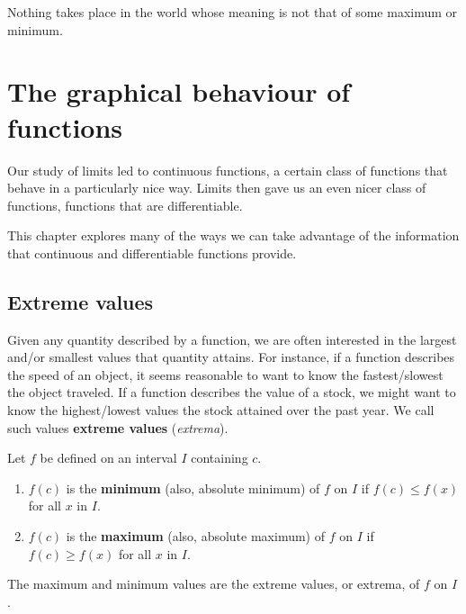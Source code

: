 \begin{savequote}[75mm]
Nothing takes place in the world whose meaning is not that of some maximum or minimum.
\end{savequote}

\chapter{The graphical behaviour of functions}
\label{chap_behaviour}
\graphicspath{{figures/Behaviour/}}



Our study of limits led to continuous functions,  a certain class of functions that behave in a particularly nice way. Limits then gave us an even nicer class of functions, functions that are differentiable.

This chapter explores many of the ways we can take advantage of the information that continuous and differentiable functions  provide.

\section{Extreme values}\label{sec:extreme_values}

Given any quantity described by a function, we are often interested in the largest and/or smallest values that quantity attains. For instance, if a function describes the speed of an object, it seems reasonable to want to know the fastest/slowest the object traveled. If a function describes the value of a stock, we might want to know  the highest/lowest values the stock attained over the past year. We call such values \textbf{extreme values} (\textit{extrema}). 

\ifcalculus
\begin{definition}\label{def:extreme_values}
Let $f$ be defined on an interval $I$ containing $c$.
	\begin{enumerate}[align=left]
	\item		$f(c)$ is the \textbf{minimum} (also, absolute minimum) of $f$ on $I$ if $f(c) \leq f(x)$ for all $x$ in $I$.
	\item		$f(c)$ is the \textbf{maximum} (also, absolute maximum) of $f$ on $I$ if $f(c) \geq f(x)$ for all $x$ in $I$.
	\end{enumerate}
	The maximum and minimum values are the extreme values, or extrema, of $f$ on $I$.
\end{definition}
\fi


